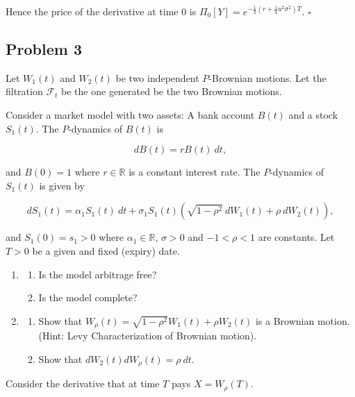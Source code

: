 \documentclass[
]{book}
\providecommand{\tightlist}{%
  \setlength{\itemsep}{0pt}\setlength{\parskip}{0pt}}
\begin{document}
Hence the price of the derivative at time 0 is \(\Pi_0[Y]=e^{-\frac{1}{2}\left( r+\frac{1}{4}u^2\sigma^2\right)T}\). \(\square\)

\noindent\makebox[\linewidth]{\rule{\textwidth}{0.4pt}}

\hypertarget{problem-3-2}{%
\subsection{Problem 3}\label{problem-3-2}}

Let \(W_1(t)\) and \(W_2(t)\) be two independent \(P\)-Brownian motions. Let the filtration \(\mathcal{F}_t\) be the one generated be the two Brownian motions.

Consider a market model with two assets: A bank account \(B(t)\) and a stock \(S_1(t)\). The \(P\)-dynamics of \(B(t)\) is

\[
dB(t)=rB(t)\ dt,
\]

and \(B(0)=1\) where \(r\in\mathbb{R}\) is a constant interest rate. The \(P\)-dynamics of \(S_1(t)\) is given by

\[
dS_1(t)=\alpha_1S_1(t)\ dt + \sigma_1 S_1(t)\left(\sqrt{1-\rho^2}\ dW_1(t)+\rho\ dW_2(t)\right),
\]

and \(S_1(0)=s_1>0\) where \(\alpha_1\in\mathbb{R}\), \(\sigma >0\) and \(-1<\rho<1\) are constants. Let \(T>0\) be a given and fixed (expiry) date.

\begin{enumerate}
\def\labelenumi{\alph{enumi}.}
\item
  \begin{enumerate}
  \def\labelenumii{\roman{enumii}.}
  \tightlist
  \item
    Is the model arbitrage free?
  \item
    Is the model complete?
  \end{enumerate}
\item
  \begin{enumerate}
  \def\labelenumii{\roman{enumii}.}
  \tightlist
  \item
    Show that \(W_\rho(t)=\sqrt{1-\rho^2}W_1(t)+\rho W_2(t)\) is a Brownian motion. (Hint: Levy Characterization of Brownian motion).
  \item
    Show that \(dW_2(t)d W_\rho(t)=\rho\ dt\).
  \end{enumerate}
\end{enumerate}

Consider the derivative that at time \(T\) pays \(X=W_\rho(T)\).
\end{document}
